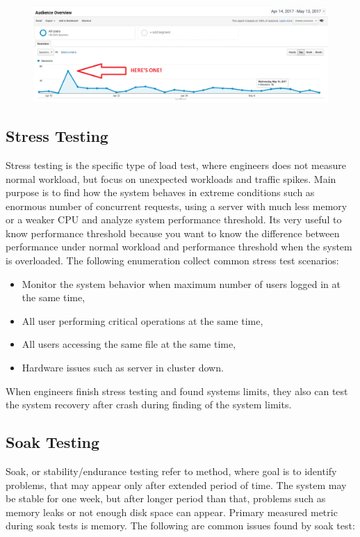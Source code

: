 \begin{figure}[H]
  \centering
  \includegraphics[width=15cm]{obrazky-figures/spike.png}
  \caption{}
  \label{fig:load_test}
\end{figure}

\subsection*{Stress Testing}
\label{Stress Testing}
Stress testing is the specific type of load test, where engineers does not measure normal workload, but focus on unexpected workloads and traffic spikes. Main purpose is to find how the system behaves in extreme conditions such as enormous number of concurrent requests, using a server with much less memory or a weaker CPU and analyze system performance threshold. Its very useful to know performance threshold because you want to know the difference between performance under normal workload and performance threshold when the system is overloaded. The following enumeration collect common stress test scenarios: 

\begin{itemize}
	\setlength\itemsep{0em}
	\item Monitor the system behavior when maximum number of users logged in at the same time,
	\item All user performing critical operations at the same time,
	\item All users accessing the same file at the same time,
	\item Hardware issues such as server in cluster down.
\end{itemize} 

When engineers finish stress testing and found systems limits, they also can test the system recovery after crash during finding of the system limits.


\subsection*{Soak Testing}
\label{Soak Testing}
Soak, or stability/endurance testing refer to method, where goal is to identify problems, that may appear only after extended period of time. The system may be stable for one week, but after longer period than that, problems such as memory leaks or not enough disk space can appear. Primary measured metric during soak tests is memory. The following are common issues found by soak test:

